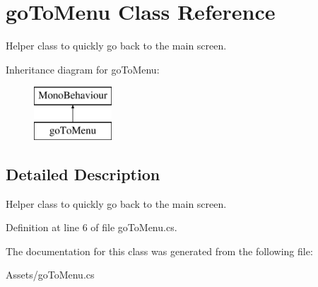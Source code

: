 \hypertarget{classgo_to_menu}{\section{go\+To\+Menu Class Reference}
\label{classgo_to_menu}
}


Helper class to quickly go back to the main screen.  


Inheritance diagram for go\+To\+Menu\+:\begin{figure}[H]
\begin{center}
\leavevmode
\includegraphics[height=2.000000cm]{classgo_to_menu}
\end{center}
\end{figure}


\subsection{Detailed Description}
Helper class to quickly go back to the main screen. 



Definition at line 6 of file go\+To\+Menu.\+cs.



The documentation for this class was generated from the following file\+:\begin{DoxyCompactItemize}
\item 
Assets/go\+To\+Menu.\+cs\end{DoxyCompactItemize}
